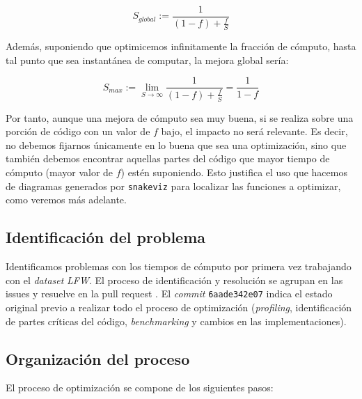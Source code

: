 \begin{equation} \label{eq:amdahl}
    S_{global} := \frac{1}{(1 - f) + \frac{f}{S}}
\end{equation}

Además, suponiendo que optimicemos infinitamente la fracción de cómputo, hasta tal punto que sea instantánea de computar, la mejora global sería:

\begin{equation}
    S_{max} := \lim_{S \to \infty}\frac{1}{(1 - f) + \frac{f}{S}} = \frac{1}{1 - f}
\end{equation}

Por tanto, aunque una mejora de cómputo sea muy buena, si se realiza sobre una porción de código con un valor de $f$ bajo, el impacto no será relevante. Es decir, no debemos fijarnos únicamente en lo buena que sea una optimización, sino que también debemos encontrar aquellas partes del código que mayor tiempo de cómputo (mayor valor de $f$) estén suponiendo. Esto justifica el uso que hacemos de diagramas generados por \lstinline{snakeviz} para localizar las funciones a optimizar, como veremos más adelante.

\subsection{Identificación del problema}

Identificamos problemas con los tiempos de cómputo por primera vez trabajando con el \textit{dataset} \textit{LFW}. El proceso de identificación y resolución se agrupan en las issues \cite{informatica:issue35_profiling} \cite{informatica:issue36_slowmetrics} y resuelve en la pull request \cite{informatica:pr42_profiling}. El \textit{commit} \lstinline{6aade342e07} \cite{informatica:commit_base_optimizacion} indica el estado original previo a realizar todo el proceso de optimización (\textit{profiling}, identificación de partes críticas del código, \textit{benchmarking} y cambios en las implementaciones).

\subsection{Organización del proceso}

El proceso de optimización se compone de los siguientes pasos:


